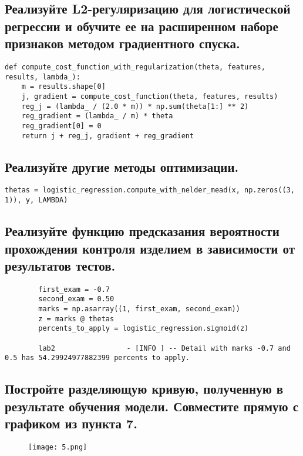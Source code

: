 \subsection{Реализуйте L2-регуляризацию для логистической регрессии и обучите ее на расширенном наборе признаков методом градиентного спуска.}

\begin{lstlisting}
def compute_cost_function_with_regularization(theta, features, results, lambda_):
    m = results.shape[0]
    j, gradient = compute_cost_function(theta, features, results)
    reg_j = (lambda_ / (2.0 * m)) * np.sum(theta[1:] ** 2)
    reg_gradient = (lambda_ / m) * theta
    reg_gradient[0] = 0
    return j + reg_j, gradient + reg_gradient
\end{lstlisting}

\subsection{Реализуйте другие методы оптимизации.}

\begin{lstlisting}
thetas = logistic_regression.compute_with_nelder_mead(x, np.zeros((3, 1)), y, LAMBDA)
\end{lstlisting}

\subsection{Реализуйте функцию предсказания вероятности прохождения контроля изделием в зависимости от результатов тестов.}

\begin{lstlisting}
        first_exam = -0.7
        second_exam = 0.50
        marks = np.asarray((1, first_exam, second_exam))
        z = marks @ thetas
        percents_to_apply = logistic_regression.sigmoid(z)

        lab2                 - [INFO ] -- Detail with marks -0.7 and 0.5 has 54.29924977882399 percents to apply.
\end{lstlisting}

\subsection{Постройте разделяющую кривую, полученную в результате обучения модели. Совместите прямую с графиком из пункта 7.}

\begin{figure}[h]
\centering
    \texttt{[image: 5.png]}
    \label{sec:purpose:payings}
\end{figure}

